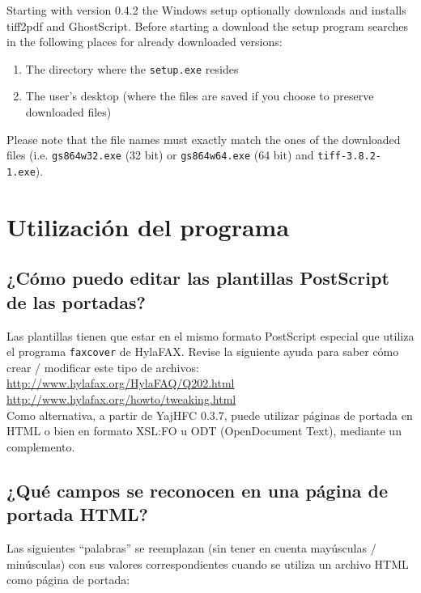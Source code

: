 \documentclass[a4paper,10pt]{scrartcl}
\begin{document}
Starting with version 0.4.2 the Windows setup optionally downloads and installs tiff2pdf and GhostScript.
Before starting a download the setup program searches in the following places for already downloaded versions:
\begin{enumerate}
 \item The directory where the \texttt{setup.exe} resides
 \item The user's desktop (where the files are saved if you choose to preserve downloaded files)
\end{enumerate}

Please note that the file names must exactly match the ones of the downloaded files (i.e. \texttt{gs864w32.exe} (32 bit) or \texttt{gs864w64.exe} (64 bit) and \texttt{tiff-3.8.2-1.exe}).

\section{Utilización del programa}	

\subsection{¿Cómo puedo editar las plantillas PostScript de las portadas?}
Las plantillas tienen que estar en el mismo formato PostScript especial 
que utiliza el programa \texttt{faxcover} de HylaFAX. Revise la siguiente ayuda 
para saber cómo crear / modificar este tipo de archivos: \\
\url{http://www.hylafax.org/HylaFAQ/Q202.html}\\
\url{http://www.hylafax.org/howto/tweaking.html}\\

Como alternativa, a partir de YajHFC 0.3.7, puede utilizar páginas de portada en HTML o bien en formato XSL:FO u ODT (OpenDocument Text), mediante un complemento.

\subsection{¿Qué campos se reconocen en una página de portada HTML?}

Las siguientes ``palabras'' se reemplazan (sin tener en cuenta mayúsculas / minúsculas) con sus valores correspondientes cuando se utiliza un archivo HTML como página de portada:
\end{document}
